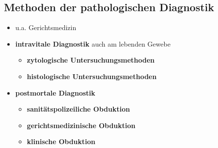 \subsection{Methoden der pathologischen Diagnostik}
	\begin{itemize}
		\item u.a. Gerichtsmedizin
		\item \textbf{intravitale Diagnostik} auch am lebenden Gewebe
			\begin{itemize}
				\item \textbf{zytologische Untersuchungsmethoden}
				\item \textbf{histologische Untersuchungsmethoden}
			\end{itemize}
		\item \textbf{postmortale Diagnostik}
			\begin{itemize}
				\item \textbf{sanitätspolizeiliche Obduktion}
				\item \textbf{gerichtsmedizinische Obduktion}
				\item \textbf{klinische Obduktion}
			\end{itemize}
	\end{itemize}

